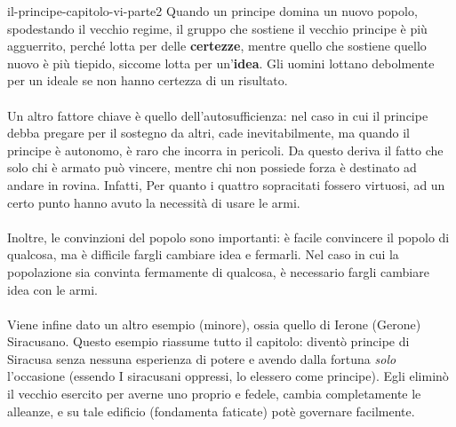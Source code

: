 \documentclass[preview]{standalone}
\begin{document}
\begin{snippet}{il-principe-capitolo-vi-parte2}
    Quando un principe domina un nuovo popolo, spodestando il vecchio regime,
    il gruppo che sostiene il vecchio principe è più agguerrito, perché lotta per delle \textbf{certezze},
    mentre quello che sostiene quello nuovo è più tiepido, siccome lotta per un'\textbf{idea}.
    Gli uomini lottano debolmente per un ideale se non hanno certezza di un risultato.
    \\\\
    Un altro fattore chiave è quello dell'autosufficienza:
    nel caso in cui il principe debba pregare per il sostegno da altri, cade inevitabilmente,
    ma quando il principe è autonomo, è raro che incorra in pericoli.
    Da questo deriva il fatto che solo chi è armato può vincere, mentre chi
    non possiede forza è destinato ad andare in rovina.
    Infatti, Per quanto i quattro sopracitati fossero virtuosi, ad un certo punto hanno avuto la necessità
    di usare le armi.
    \\\\
    Inoltre, le convinzioni del popolo sono importanti: è facile convincere il popolo di qualcosa,
    ma è difficile fargli cambiare idea e fermarli.
    Nel caso in cui la popolazione sia convinta fermamente di qualcosa, è necessario
    fargli cambiare idea con le armi.
    \\\\

    Viene infine dato un altro esempio (minore), ossia quello di Ierone (Gerone) Siracusano.
    Questo esempio riassume tutto il capitolo: diventò principe di Siracusa
    senza nessuna esperienza di potere e avendo dalla fortuna \textit{solo} l'occasione
    (essendo I siracusani oppressi, lo elessero come principe).
    Egli eliminò il vecchio esercito per averne uno proprio e fedele,
    cambia completamente le alleanze, e su tale edificio (fondamenta faticate) potè
    governare facilmente.
\end{snippet}
\end{document}
